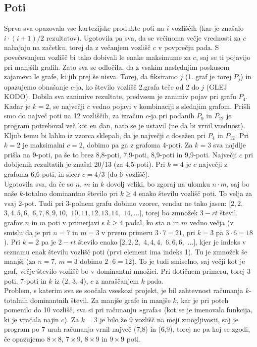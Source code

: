\documentclass[12pt, a4paper]{article}
\begin{document}
\subsection{Poti}
Sprva sva opazovala vse kartezijske produkte poti na $i$ vozliščih (kar je znašalo $i\cdot(i+1)/2$ rezultatov). Ugotovila pa sva, da se večinoma večje vrednosti za $c$ nahajajo na začetku, torej da z večanjem vozlišč $c$ v povprečju pada. S povečevanjem vozlišč bi tako dobivali le enake maksimume za $c$, saj se ti pojavijo pri manjših grafih. Zato sva se odločila, da z vsakim naslednjim poskusom zajameva le grafe, ki jih prej še nisva. Torej, da fiksiramo $j$ (1. graf je torej $P_j$) in opazujemo obnašanje $c$-ja, ko število vozlišč 2.grafa teče od 2 do $j$ (GLEJ KODO). Dobila sva zanimive rezultate, predvsem je zanimiv pojav pri grafu $P_4$. Kadar je $k=2$, se največji $c$ vedno pojavi v kombinaciji s slednjim grafom. Prišli smo do največ poti na 12 vozliščih, za izračun $c$-ja pri podanih $P_9$ in $P_{12}$ je program potreboval več kot en dan, nato se je ustavil (ne da bi vrnil vrednost). Kljub temu bi lahko iz vzorca sklepali, da je največji $c$ dosežen pri $P_4$ in $P_{12}$. Pri $k=2$ je maksimalni $c=2$, dobimo pa ga z grafoma 4-poti. Za $k=3$ sva najdlje prišla na 9-poti, pa še to brez 8,8-poti, 7,9-poti, 8,9-poti in 9,9-poti. Največji $c$ pri dobljenih rezultatih je znašal 20/13 (za 4,5-poti). Pri $k=4$ je $c$ največji z grafoma 6,6-poti, in sicer $c=4/3$ (do 6 vozlišč). \\
Ugotovila sva, da če so $n$, $m$ in $k$ dovolj veliki, bo zgoraj na ulomku $n \cdot m$, saj bo naše $k$-totalno dominantno število pri $k \geq 4$ enako številu vozlišč poti. To velja za vsaj 2-pot. Tudi pri 3-polnem grafu dobimo vzorec, vendar ne tako jasen: $[2,2,$ $3,4,5,6,$ $6,7,8,9,10,$ $10,11,12,13,14,$ $14, ...]$, torej bo zmnožek $3-rt$ števil grafov $n$ in $m$ poti v primerjavi s $k \geq 4$ padal, ko sta $n$ in $m$ vedno večja (v smislu da je pri $n=7$ in $m=3$ v prvem primeru $3 \cdot 7=21$, pri $k=3$ pa $3 \cdot 6=18$). Pri $k=2$ pa je $2-rt$ število enako $[2,2,2,$ $4,4,4,$ $6,6,6,$ $...]$, kjer je indeks v seznamu enak številu vozlišč poti (prvi element ima indeks 1). Tu je zmnožek še manjši (za $n=7$, $m=3$ dobimo $2 \cdot 6=12$). To je tudi smiselno, saj večji kot je graf, večje število vozlišč bo v dominantni množici. Pri dotičnem primeru, torej 3-poti, 7-poti in $k$ iz (2, 3, 4), $c$ z naraščanjem $k$ pada.\\
Problem, s katerim sva se soočala vseskozi projekt, je bil zahtevnost računanja $k$-totalnih dominantnih števil. Za manjše grafe in manjše $k$, kar je pri poteh pomenilo do 10 vozlišč, sva si pri računanju »grafa« (kot se je imenovala funkcija, ki je vračala najin $c$). Za $k=3$ je bilo že 9 vozlišč na meji zmogljivosti, saj je program po 7 urah računanja vrnil največ (7,8) in (6,9), torej ne pa kaj se zgodi, če opazujemo $8\times8$, $7\times9$, $8\times9$ in $9\times9$ poti. \\
\end{document}
